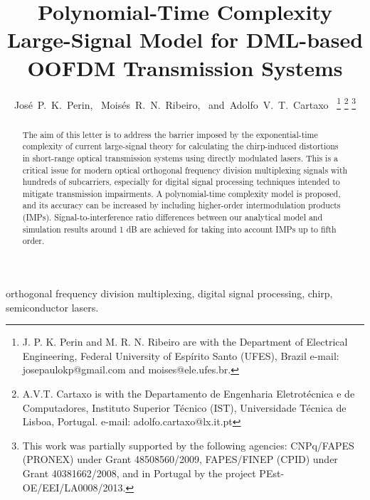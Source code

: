 \documentclass[journal]{IEEEtran}
\makeatletter
\def\markboth#1#2{\def\leftmark{\@IEEEcompsoconly{\sffamily}\MakeUppercase{\protect#1}}%
\def\rightmark{\@IEEEcompsoconly{\sffamily}\MakeUppercase{\protect#2}}}
\makeatother
\begin{document}
 
\title{Polynomial-Time Complexity Large-Signal Model for DML-based OOFDM Transmission Systems}
\author{José~P.~K.~Perin,~\IEEEmembership{}
        Moisés~R.~N.~Ribeiro,~\IEEEmembership{}
        and~Adolfo~V.~T.~Cartaxo~%
\thanks{J. P. K. Perin and M. R. N. Ribeiro are with the Department of Electrical Engineering, Federal University of Espírito Santo (UFES), Brazil e-mail: josepaulokp@gmail.com and moises@ele.ufes.br.}%
\thanks{A.V.T. Cartaxo is with the Departamento de Engenharia Eletrotécnica e de Computadores, Instituto Superior Técnico (IST), Universidade Técnica de Lisboa, Portugal. e-mail: adolfo.cartaxo@lx.it.pt}
\thanks{This work was partially supported by the following agencies: CNPq/FAPES (PRONEX) under Grant 48508560/2009, FAPES/FINEP (CPID) under Grant 40381662/2008, and in Portugal by the project PEst-OE/EEI/LA0008/2013.}%
}

\markboth{IEEE PHOTONICS TECHNOLOGY LETTERS, VOL. ~XX, NO. ~X, JANUARY XX~XXXX}{}%
\maketitle
\begin{abstract}
The aim of this letter is to address the barrier imposed by the exponential-time complexity of current large-signal theory for calculating the chirp-induced distortions in short-range optical transmission systems using directly modulated lasers. This is a critical issue for modern optical orthogonal frequency division multiplexing signals with hundreds of subcarriers, especially for digital signal processing techniques intended to mitigate transmission impairments. A polynomial-time complexity model is proposed, and its accuracy can be increased by including higher-order intermodulation products (IMPs). Signal-to-interference ratio differences between our analytical model and simulation results around 1 dB are achieved for taking into account IMPs up to fifth order. 
\end{abstract}
\begin{IEEEkeywords}
orthogonal frequency division multiplexing, digital signal processing, chirp, semiconductor lasers.
\end{IEEEkeywords}
\IEEEpeerreviewmaketitle
\end{document}
